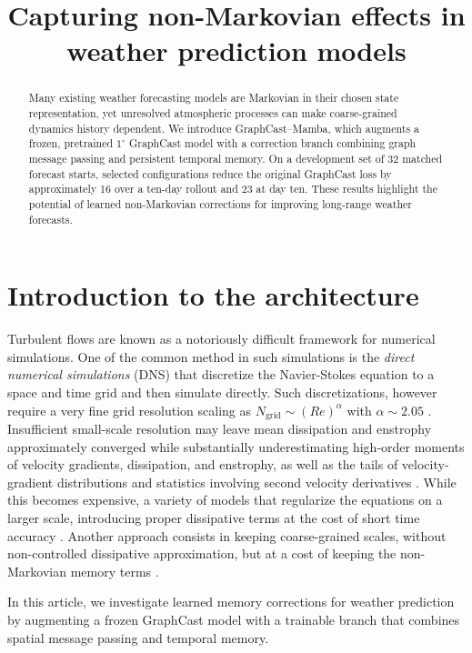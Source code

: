 \documentclass{article}
\title{Capturing non-Markovian effects in weather prediction models}
\author{
}
\begin{document}
\maketitle


\begin{abstract}
Many existing weather forecasting models are Markovian in their chosen state representation, yet unresolved atmospheric processes can make coarse-grained dynamics history dependent. We introduce GraphCast–Mamba, which augments a frozen, pretrained \(1^\circ\) GraphCast model with a correction branch combining graph message passing and persistent temporal memory. On a development set of 32 matched forecast starts, selected configurations reduce the original GraphCast loss by approximately 16 over a ten-day rollout and 23 at day ten. These results highlight the potential of learned non-Markovian corrections for improving long-range weather forecasts.
\end{abstract}



\section{Introduction to the architecture}
Turbulent flows are known as a notoriously difficult framework for numerical simulations. One of the common method in such simulations is the \textit{direct numerical simulations} (DNS) that discretize the Navier-Stokes equation to a space and time grid and then simulate directly. Such discretizations, however require a very fine grid resolution scaling as $N_{\textrm{grid}} \sim \left(Re\right)^{\alpha}$ with $\alpha \sim 2.05 $ \cite{yang2021grid}. Insufficient small-scale resolution may leave mean dissipation and enstrophy approximately converged while substantially underestimating high-order moments of velocity gradients, dissipation, and enstrophy, as well as the tails of velocity-gradient distributions and statistics involving second velocity derivatives \cite{DonzisResolutionEffects}.
 While this becomes expensive, a variety of models that regularize the equations on a larger scale, introducing proper dissipative terms at the cost of short time accuracy \cite{Wilson1996Review}. Another approach consists in keeping coarse-grained scales, without non-controlled dissipative approximation, but at a cost of keeping the non-Markovian memory terms \cite{YenTingLinMZ2021,de2026data}.

In this article, we investigate learned memory corrections for weather prediction by augmenting a frozen GraphCast model with a trainable branch that combines spatial message passing and temporal memory.
\end{document}
